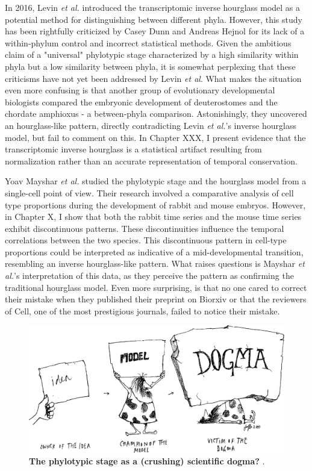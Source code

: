 In 2016, Levin \textit{et al.} introduced the transcriptomic inverse hourglass model as a potential method for distinguishing between different phyla\cite{Levin2016}. However, this study has been rightfully criticized by Casey Dunn and Andreas Hejnol for its lack of a within-phylum control\cite{hejnol2016} and incorrect statistical methods\cite{Dunn2018}. Given the ambitious claim of a "universal" phylotypic stage characterized by a high similarity within phyla but a low similarity between phyla, it is somewhat perplexing that these criticisms have not yet been addressed by Levin \textit{et al}. What makes the situation even more confusing is that another group of evolutionary developmental biologists compared the embryonic development of deuterostomes and the chordate amphioxus - a between-phyla comparison. Astonishingly, they uncovered an hourglass-like pattern\cite{PerezPosada2022}, directly contradicting Levin \textit{et al.}'s inverse hourglass model, but fail to comment on this. In Chapter XXX, I present evidence that the transcriptomic inverse hourglass is a statistical artifact resulting from normalization rather than an accurate representation of temporal conservation. 

Yoav Mayshar \textit{et al.} studied the phylotypic stage and the hourglass model from a single-cell point of view\cite{Mayshar2023}. Their research involved a comparative analysis of cell type proportions during the development of rabbit and mouse embryos. However, in Chapter X, I show that both the rabbit time series and the mouse time series exhibit discontinuous patterns. These discontinuities influence the temporal correlations between the two species. This discontinuous pattern in cell-type proportions could be interpreted as indicative of a mid-developmental transition, resembling an inverse hourglass-like pattern. What raises questions is Mayshar \textit{et al.}'s interpretation of this data, as they perceive the pattern as confirming the traditional hourglass model. Even more surprising, is that no one cared to correct their mistake when they published their preprint on Biorxiv or that the reviewers of Cell, one of the most prestigious journals, failed to notice their mistake.

\begin{figure}
    \includegraphics[width=\linewidth]{ch.discussion/imgs/dogma.png}
    \caption{\textbf{The phylotypic stage as a (crushing) scientific dogma?} \cite{Caveman2000}.}
    \label{fig:dogma}
\end{figure}

